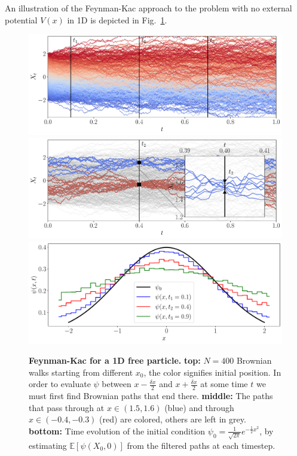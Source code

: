 An illustration of the Feynman-Kac approach to the problem with no external potential $V(x)$ in 1D is depicted in Fig.~\ref{fig:fk_1d_example}.
\begin{figure}[H]
	\centering
	\subfloat
	{\includegraphics[width = \linewidth]{Chapter2/Figs/Raster/fkac_vs_fplanck_top.pdf}} \\
	\subfloat
	{\includegraphics[width = \linewidth]{Chapter2/Figs/Raster/fkac_vs_fplanck_mid1.pdf}} \\
	\subfloat
	{\includegraphics[width = \linewidth]{Chapter2/Figs/Raster/fkac_vs_fplanck_bottom.pdf}}
	
	\caption[Feynman-Kac for a 1D free particle]{\textbf{Feynman-Kac for a 1D free particle.} \textbf{top:} $N=400$ Brownian walks starting from different $x_0$, the color signifies initial position. In order to evaluate $\psi$ between $x-\frac{\delta x}{2}$ and $x+\frac{\delta x}{2}$ at some time $t$ we must first find Brownian paths that end there. \textbf{middle:} The paths that pass through at $x \in (1.5, 1.6)$ (blue) and through $x \in (-0.4,-0.3)$ (red) are colored, others are left in grey. \textbf{bottom:} Time evolution of the initial condition $\psi_{0} = \frac{1}{\sqrt{2 \pi}} e^{-\frac{1}{2} x^{2}}$, by estimating ${\mathbb{E}}\left[\psi\left(X_{0}, 0\right)\right]$ from the filtered paths at each timestep.}
	\label{fig:fk_1d_example}
\end{figure}

